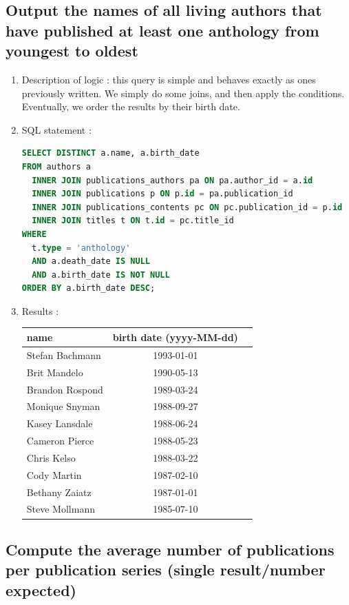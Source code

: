 \documentclass[doubleside, titlepage]{article}
\begin{document}
\subsection{Output the names of all living authors that have published at least one anthology from youngest to oldest}

	\begin{enumerate}
	\item Description of logic : this query is simple and behaves exactly as ones previously written. We simply do some joins, and then apply the conditions. Eventually, we order the results by their birth date.
	\item SQL statement :
		\begin{lstlisting}[language=SQL,showspaces=false,basicstyle=\ttfamily,numberstyle=\tiny,commentstyle=\color{gray}]
SELECT DISTINCT a.name, a.birth_date
FROM authors a
  INNER JOIN publications_authors pa ON pa.author_id = a.id
  INNER JOIN publications p ON p.id = pa.publication_id
  INNER JOIN publications_contents pc ON pc.publication_id = p.id
  INNER JOIN titles t ON t.id = pc.title_id
WHERE
  t.type = 'anthology'
  AND a.death_date IS NULL
  AND a.birth_date IS NOT NULL
ORDER BY a.birth_date DESC;
		\end{lstlisting}

	\item Results :\\

	\begin{tabular}{|l|c|r|}
	  \hline
		name & birth date (yyyy-MM-dd)\\
	  \hline
Stefan Bachmann	& 1993-01-01\\
Brit Mandelo	& 1990-05-13\\
Brandon Rospond	& 1989-03-24\\
Monique Snyman	& 1988-09-27\\
Kasey Lansdale	& 1988-06-24\\
Cameron Pierce	& 1988-05-23\\
Chris Kelso	& 1988-03-22\\
Cody Martin	& 1987-02-10\\
Bethany Zaiatz	& 1987-01-01\\
Steve Mollmann	& 1985-07-10\\
	  \hline
	\end{tabular}
\end{enumerate}

\subsection{Compute the average number of publications per publication series (single result/number expected)}
\end{document}
